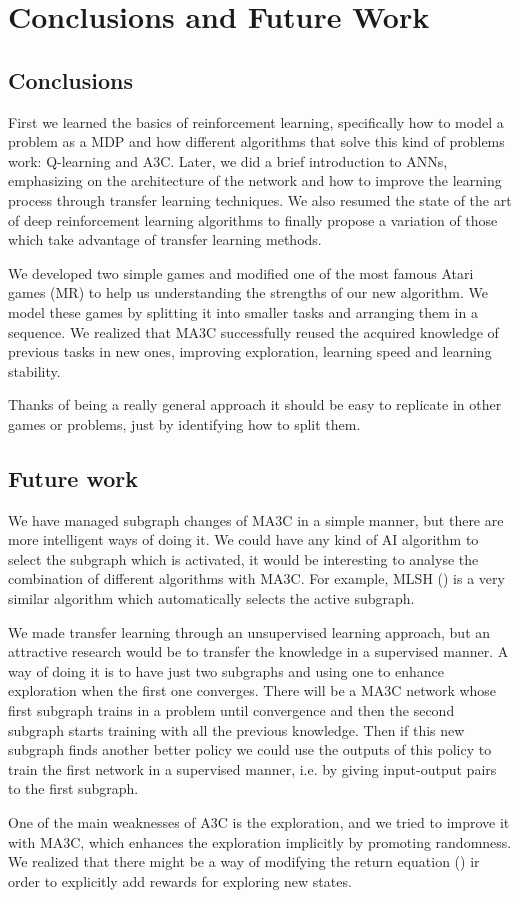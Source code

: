 \chapter{Conclusions and Future Work}
\section{Conclusions}
First we learned the basics of reinforcement learning, specifically how to model a problem as a \acl{MDP} and how different
algorithms that solve this kind of problems work: Q-learning and \acl{A3C}.
Later, we did a brief introduction to \aclp{ANN}, emphasizing on the architecture of the network and how to improve
the learning process through transfer learning techniques.
We also resumed the state of the art of deep reinforcement learning algorithms to finally propose a variation of those
which take advantage of transfer learning methods.

We developed two simple games and modified one of the most famous Atari games (\acl{MR}) to help us understanding the
strengths of our new algorithm.
We model these games by splitting it into smaller tasks and arranging them in a sequence.
We realized that \ac{MA3C} successfully reused the acquired knowledge of previous tasks in new ones, improving exploration,
learning speed and learning stability.

Thanks of being a really general approach it should be easy to replicate in other games or problems, just by identifying
how to split them.

\section{Future work}

We have managed subgraph changes of \ac{MA3C} in a simple manner, but there are more intelligent ways of doing it.
We could have any kind of \ac{AI} algorithm to select the subgraph which is activated, it would be interesting to analyse
the combination of different algorithms with \ac{MA3C}.
For example, MLSH (\cite{frans2017meta}) is a very similar algorithm which automatically selects the active subgraph.

We made transfer learning through an unsupervised learning approach, but an attractive research would be to transfer the
knowledge in a supervised manner.
A way of doing it is to have just two subgraphs and using one to enhance exploration when the first one converges.
There will be a \ac{MA3C} network whose first subgraph trains in a problem until convergence and then the second subgraph
starts training with all the previous knowledge.
Then if this new subgraph finds another better policy we could use the outputs of this policy to train the first network
in a supervised manner, i.e. by giving input-output pairs to the first subgraph.

One of the main weaknesses of \ac{A3C} is the exploration, and we tried to improve it with \ac{MA3C}, which enhances the
exploration implicitly by promoting randomness.
We realized that there might be a way of modifying the return equation () ir order to explicitly add
rewards for exploring new states.

